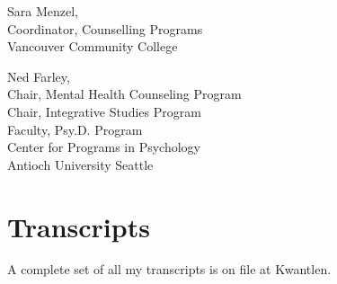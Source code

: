 \documentclass[10pt,DIV09,letterpaper,oneside,headsepline]{scrreprt}
\begin{document}
\vspace{\baselineskip}

\begin{flushleft}

Sara Menzel,\\
Coordinator, Counselling Programs\\
Vancouver Community College

\end{flushleft}

\vspace{\baselineskip}

\begin{flushleft}

Ned Farley,\\
Chair, Mental Health Counseling Program\\
Chair, Integrative Studies Program\\
Faculty, Psy.D. Program\\
Center for Programs in Psychology\\
Antioch University Seattle\\

\end{flushleft}

\chapter{Transcripts}

A complete set of all my transcripts is on file at Kwantlen.
\end{document}
